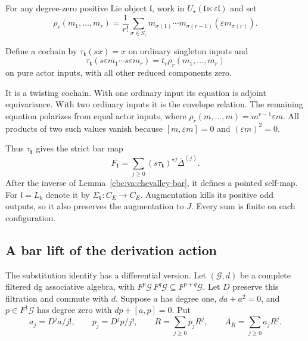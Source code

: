 For any degree-zero positive Lie object
$\mathfrak l$, work in
$U_\star(\mathfrak l\ltimes\varepsilon\mathfrak l)$
and set
\[
 \rho_r(m_1,\ldots,m_r)
   =\frac1{r!}\sum_{\sigma\in S_r}
      m_{\sigma(1)}\cdots m_{\sigma(r-1)}
                       (\varepsilon m_{\sigma(r)}).
\]

Define a cochain by $\tau_{\mathbf t}(sx)=x$
on ordinary singleton inputs and
\[
 \tau_{\mathbf t}
   (s\varepsilon m_1\cdots s\varepsilon m_r)
       =t_r\rho_r(m_1,\ldots,m_r)
\]
on pure actor inputs, with all other reduced
components zero.

It is a twisting cochain. With one ordinary
input its equation is adjoint equivariance.
With two ordinary inputs it is the envelope
relation. The remaining equation polarizes
from equal actor inputs, where
$\rho_r(m,\ldots,m)=m^{r-1}\varepsilon m$.
All products of two such values vanish because
$[m,\varepsilon m]=0$ and $(\varepsilon m)^2=0$.

Thus $\tau_{\mathbf t}$ gives the strict bar map
\begin{equation}\label{cbc:va:actor-bar-map}
 F_{\mathbf t}
   =\sum_{j\geq0}(s\tau_{\mathbf t})^{\star j}
                                  \overline\Delta^{(j)}.
\end{equation}
After the inverse of
Lemma~\ref{cbc:va:chevalley-bar}, it defines a
pointed self-map. For $\mathfrak l=L_k$ denote
it by $\Sigma_{\mathbf t}:C_E\to C_E$.
Augmentation kills its positive odd outputs,
so it also preserves the augmentation to $J$.
Every sum is finite on each configuration.

\subsection{A bar lift of the derivation action}

The substitution identity has a differential
version. Let $(\mathcal G,d)$ be a complete
filtered dg associative algebra, with
$F^p\mathcal G\,F^q\mathcal G\subseteq F^{p+q}\mathcal G$.
Let $D$ preserve this filtration and commute
with $d$. Suppose $a$ has degree one,
$da+a^2=0$, and $p\in F^1\mathcal G$ has
degree zero with $dp+[a,p]=0$.
Put
\[
 a_j=D^ja/j!,\qquad p_j=D^jp/j!,\qquad
 R=\sum_{j\geq0}p_jR^j,\qquad
 A_R=\sum_{j\geq0}a_jR^j.
\]

